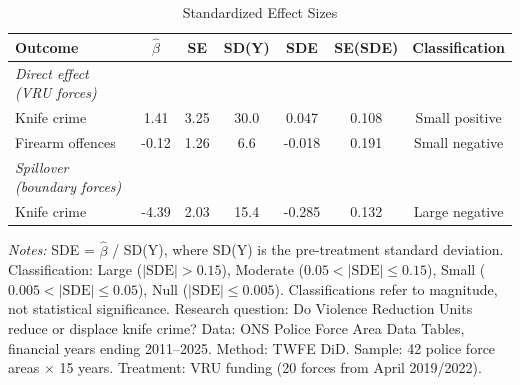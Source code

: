 \begin{table}[htbp]
\centering
\caption{Standardized Effect Sizes}
\label{tab:sde}
\begin{threeparttable}
\begin{tabular}{lcccccc}
\toprule
Outcome & $\hat{\beta}$ & SE & SD(Y) & SDE & SE(SDE) & Classification \\
\midrule
\emph{Direct effect (VRU forces)} & & & & & & \\
Knife crime & 1.41 & 3.25 & 30.0 & 0.047 & 0.108 & Small positive \\
Firearm offences & -0.12 & 1.26 & 6.6 & -0.018 & 0.191 & Small negative \\
[0.5em]
\emph{Spillover (boundary forces)} & & & & & & \\
Knife crime & -4.39 & 2.03 & 15.4 & -0.285 & 0.132 & Large negative \\
\bottomrule
\end{tabular}
\begin{tablenotes}[flushleft]\footnotesize
\item \textit{Notes:} SDE = $\hat{\beta}$ / SD(Y), where SD(Y) is the pre-treatment standard deviation. Classification: Large ($|\text{SDE}| > 0.15$), Moderate ($0.05 < |\text{SDE}| \leq 0.15$), Small ($0.005 < |\text{SDE}| \leq 0.05$), Null ($|\text{SDE}| \leq 0.005$). Classifications refer to magnitude, not statistical significance. Research question: Do Violence Reduction Units reduce or displace knife crime? Data: ONS Police Force Area Data Tables, financial years ending 2011--2025. Method: TWFE DiD. Sample: 42 police force areas $\times$ 15 years. Treatment: VRU funding (20 forces from April 2019/2022).
\end{tablenotes}
\end{threeparttable}
\end{table}

